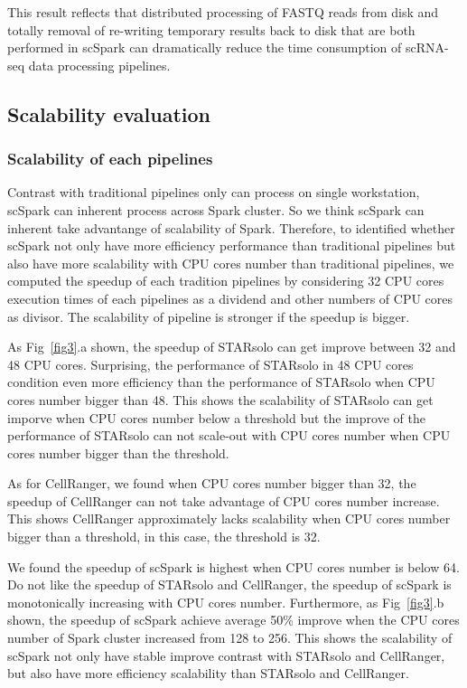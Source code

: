 \documentclass[conference]{IEEEtran}
\begin{document}
This result reflects that distributed processing of FASTQ reads from disk and totally removal of re-writing temporary results back to disk that are both performed in scSpark can dramatically reduce the time consumption of scRNA-seq data processing pipelines. 

\subsection{Scalability evaluation}

\subsubsection{Scalability of each pipelines}
Contrast with traditional pipelines only can process on single workstation, scSpark can inherent process across Spark cluster.
So we think scSpark can inherent take advantange of scalability of Spark.
Therefore, to identified whether scSpark not only have more efficiency performance than traditional pipelines but also have more scalability with CPU cores number than traditional pipelines,
we computed the speedup of each tradition pipelines by considering 32 CPU cores execution times of each pipelines as a dividend and other numbers of CPU cores as divisor.
The scalability of pipeline is stronger if the speedup is bigger.

As Fig~\ref{fig3}.a shown, the speedup of STARsolo can get improve between 32 and 48 CPU cores.
Surprising, the performance of STARsolo in 48 CPU cores condition even more efficiency than the performance of STARsolo when CPU cores number bigger than 48.
This shows the scalability of STARsolo can get imporve when CPU cores number below a threshold but the improve of the performance of STARsolo can not scale-out with CPU cores number when CPU cores number bigger than the threshold.

As for CellRanger, we found when CPU cores number bigger than 32, the speedup of CellRanger can not take advantage of CPU cores number increase.
This shows CellRanger approximately lacks scalability when CPU cores number bigger than a threshold, in this case, the threshold is 32.

We found the speedup of scSpark is highest when CPU cores number is below 64.
Do not like the speedup of STARsolo and CellRanger, the speedup of scSpark is monotonically increasing with CPU cores number.
Furthermore, as Fig~\ref{fig3}.b shown, the speedup of scSpark achieve average 50\% improve when the CPU cores number of Spark cluster increased from 128 to 256.
This shows the scalability of scSpark not only have stable improve contrast with STARsolo and CellRanger, but also have more efficiency scalability than STARsolo and CellRanger.
\end{document}
